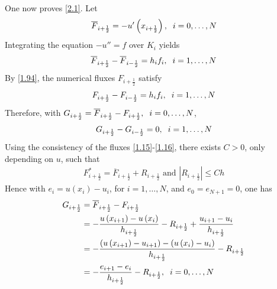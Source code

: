 \documentclass[a4paper]{article}
\numberwithin{equation}{section}
\begin{document}
One now proves \eqref{2.1}. Let
\begin{align}
{\overline F _{i + \frac{1}{2}}} =  - {u'}\left( {{x_{i + \frac{1}{2}}}} \right),\hspace{0.2cm} i = 0, \ldots ,N
\end{align}
Integrating the equation $-u''=f$ over $K_i$ yields
\begin{align}
{\overline F _{i + \frac{1}{2}}} - {\overline F _{i - \frac{1}{2}}} = {h_i}{f_i},\hspace{0.2cm}i = 1, \ldots ,N
\end{align}
By \eqref{1.94}, the numerical fluxes $F_{i+\frac{1}{2}}$ satisfy
\begin{align}
{F_{i + \frac{1}{2}}} - {F_{i - \frac{1}{2}}} = {h_i}{f_i},\hspace{0.2cm} i = 1, \ldots ,N
\end{align}
Therefore, with ${G_{i + \frac{1}{2}}} = {\overline F _{i + \frac{1}{2}}} - {F_{i + \frac{1}{2}}},\hspace{0.2cm}i = 0, \ldots ,N$,
\begin{align}
\label{2.19}
{G_{i + \frac{1}{2}}} - {G_{i - \frac{1}{2}}} = 0,\hspace{0.2cm}i = 1, \ldots ,N 
\end{align}
Using the consistency of the fluxes \eqref{1.15}-\eqref{1.16}, there exists $C>0$, only depending on $u$, such that
\begin{align}
\label{2.20}
F_{i + \frac{1}{2}}^* = {\overline F _{i + \frac{1}{2}}} + {R_{i + \frac{1}{2}}}\mbox{ and } \left| {{R_{i + \frac{1}{2}}}} \right| \le Ch
\end{align}
Hence with ${e_i} = u\left( {{x_i}} \right) - {u_i}$, for $i=1,\ldots,N$, and $e_0=e_{N+1}=0$, one has
\begin{align}
{G_{i + \frac{1}{2}}} &= {\overline F _{i + \frac{1}{2}}} - {F_{i + \frac{1}{2}}}\\
& =  - \frac{{u\left( {{x_{i + 1}}} \right) - u\left( {{x_i}} \right)}}{{{h_{i + \frac{1}{2}}}}} - {R_{i + \frac{1}{2}}} + \frac{{{u_{i + 1}} - {u_i}}}{{{h_{i + \frac{1}{2}}}}}\\
 &=  - \frac{{\left( {u\left( {{x_{i + 1}}} \right) - {u_{i + 1}}} \right) - \left( {u\left( {{x_i}} \right) - {u_i}} \right)}}{{{h_{i + \frac{1}{2}}}}} - {R_{i + \frac{1}{2}}}\\
& =  - \frac{{{e_{i + 1}} - {e_i}}}{{{h_{i + \frac{1}{2}}}}} - {R_{i + \frac{1}{2}}},\hspace{0.2cm}i = 0, \ldots ,N \label{2.24}
\end{align}
\end{document}
